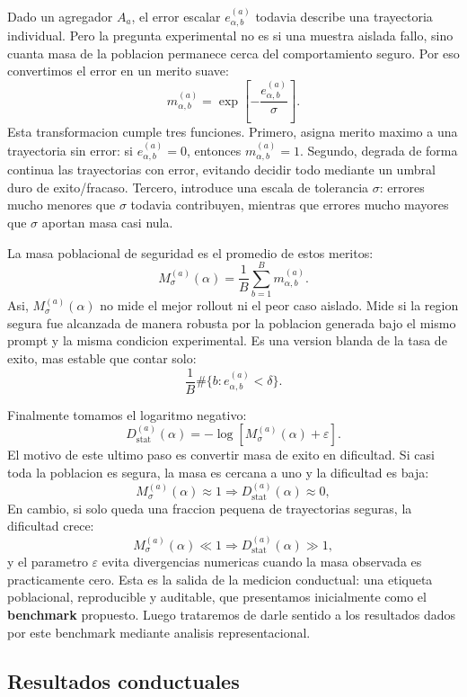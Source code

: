 \documentclass[10pt,twocolumn]{article}
\newcommand{\Mmass}{M_{\sigma}}
\begin{document}
Dado un agregador \(A_a\), el error escalar \(e^{(a)}_{\alpha,b}\) todavia describe una trayectoria individual. Pero la pregunta experimental no es si una muestra aislada fallo, sino cuanta masa de la poblacion permanece cerca del comportamiento seguro. Por eso convertimos el error en un merito suave:
\[
m^{(a)}_{\alpha,b}
=
\exp\left[
-\frac{e^{(a)}_{\alpha,b}}{\sigma}
\right].
\]
Esta transformacion cumple tres funciones. Primero, asigna merito maximo a una trayectoria sin error: si \(e^{(a)}_{\alpha,b}=0\), entonces \(m^{(a)}_{\alpha,b}=1\). Segundo, degrada de forma continua las trayectorias con error, evitando decidir todo mediante un umbral duro de exito/fracaso. Tercero, introduce una escala de tolerancia \(\sigma\): errores mucho menores que \(\sigma\) todavia contribuyen, mientras que errores mucho mayores que \(\sigma\) aportan masa casi nula.

La masa poblacional de seguridad es el promedio de estos meritos:
\[
\Mmass^{(a)}(\alpha)
=
\frac{1}{B}
\sum_{b=1}^{B}
m^{(a)}_{\alpha,b}.
\]
Asi, \(\Mmass^{(a)}(\alpha)\) no mide el mejor rollout ni el peor caso aislado. Mide si la region segura fue alcanzada de manera robusta por la poblacion generada bajo el mismo prompt y la misma condicion experimental. Es una version blanda de la tasa de exito, mas estable que contar solo:
\[
\frac{1}{B}
\#\{b:e^{(a)}_{\alpha,b}<\delta\}.
\]

Finalmente tomamos el logaritmo negativo:
\[
D^{(a)}_{\mathrm{stat}}(\alpha)
=
-\log\left[
\Mmass^{(a)}(\alpha)+\varepsilon
\right].
\]
El motivo de este ultimo paso es convertir masa de exito en dificultad. Si casi toda la poblacion es segura, la masa es cercana a uno y la dificultad es baja:
\[
\Mmass^{(a)}(\alpha)\approx 1
\Rightarrow
D^{(a)}_{\mathrm{stat}}(\alpha)\approx 0,
\]
En cambio, si solo queda una fraccion pequena de trayectorias seguras, la dificultad crece:
\[
\Mmass^{(a)}(\alpha)\ll 1
\Rightarrow
D^{(a)}_{\mathrm{stat}}(\alpha)\gg 1,
\]
y el parametro \(\varepsilon\) evita divergencias numericas cuando la masa observada es practicamente cero. Esta es la salida de la medicion conductual: una etiqueta poblacional, reproducible y auditable, que presentamos inicialmente como el \textbf{benchmark} propuesto. Luego trataremos de darle sentido a los resultados dados por este benchmark mediante analisis representacional.

\subsection{Resultados conductuales}
\end{document}
